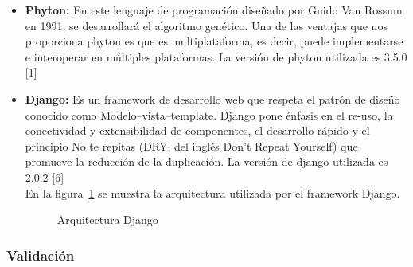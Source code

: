 	\begin{itemize}
		\item \textbf{Phyton:} En este lenguaje de programación diseñado por Guido Van Rossum en 1991, se desarrollará el algoritmo genético. Una de las ventajas que nos proporciona phyton es que es multiplataforma, es decir, puede implementarse e interoperar en múltiples plataformas. La versión de phyton utilizada es 3.5.0 [1] 
		
		\item \textbf{Django:} Es un framework de desarrollo web que respeta el patrón de diseño conocido como Modelo–vista–template. Django pone énfasis en el re-uso, la conectividad y extensibilidad de componentes, el desarrollo rápido y el principio No te repitas (DRY, del inglés Don't Repeat Yourself) que promueve la reducción de la duplicación. La versión de django utilizada es 2.0.2 [6] \\
		
		En la figura~\ref{fig:django} se muestra la arquitectura utilizada por el framework Django.
		
		\begin{figure}[htbp!]
			\begin{center}
				\caption{Arquitectura Django}
				\label{fig:django}
			\end{center}
		\end{figure}
		
	\end{itemize}
	
		
	\subsubsection{Validación}
	
